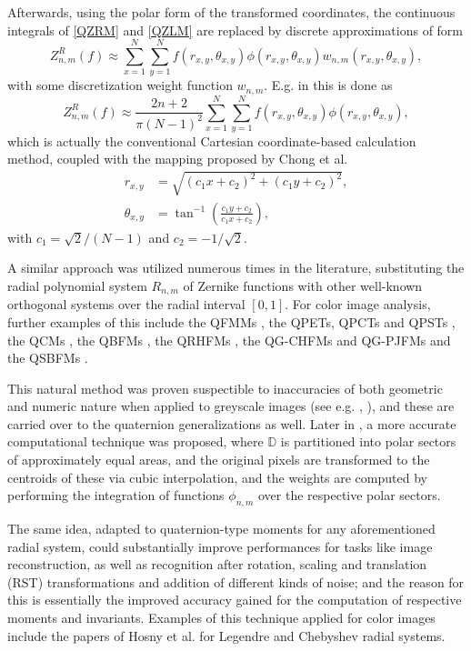 \documentclass[12pt]{article}
\newcommand{\D}{\mathbb{D}}
\begin{document}
Afterwards, using the polar form of the transformed coordinates, the continuous integrals of \eqref{QZRM} and \eqref{QZLM} are replaced by discrete approximations of form
\[
	Z_{n,m}^R(f) \approx \sum_{x=1}^N \sum_{y=1}^N f(r_{x,y},\theta_{x,y}) \phi(r_{x,y},\theta_{x,y}) w_{n,m}(r_{x,y},\theta_{x,y}),
\]
with some discretization weight function $w_{n,m}$. E.g. in \cite{ChenOriginal} this is done as
\[
	Z_{n,m}^R(f) \approx \frac{2n+2}{\pi (N-1)^2}  \sum_{x=1}^N \sum_{y=1}^N f(r_{x,y},\theta_{x,y}) \phi(r_{x,y},\theta_{x,y}),
\]
which is actually the conventional Cartesian coordinate-based calculation method, coupled with the mapping proposed by Chong et al. \cite{Chong}
\[
\begin{split}
	r_{x,y} &= \sqrt{(c_1x + c_2)^2 + (c_1y + c_2)^2}, \\
	\theta_{x,y} &= \tan^{-1}\left(\frac{c_1y + c_2}{c_1x + c_2}\right),
\end{split}
\]
with $c_1=\sqrt{2}/(N-1)$ and $c_2=-1/\sqrt{2}$. 

A similar approach was utilized numerous times in the literature, substituting the radial polynomial system $R_{n,m}$ of Zernike functions with other well-known orthogonal systems over the radial interval $[0,1]$. For color image analysis, further examples of this include the QFMMs \cite{GuoZhu}, the QPETs, QPCTs and QPSTs \cite{Li}, the QCMs \cite{Guo}, the QBFMs \cite{Shao}, the QRHFMs \cite{Wang}, the QG-CHFMs and QG-PJFMs \cite{Singh} and the QSBFMs \cite{Yang}.

This natural method was proven suspectible to inaccuracies of both geometric and numeric nature when applied to greyscale images (see e.g.  \cite{LiaoPawlak}, \cite{PawlakLiao}), and these are carried over to the quaternion generalizations as well. Later in \cite{Xin}, a more accurate computational technique was proposed, where $\D$ is partitioned into polar sectors of approximately equal areas, and the original pixels are transformed to the centroids of these via cubic interpolation, and the weights are computed by performing the integration of functions $\phi_{n,m}$ over the respective polar sectors. 

The same idea, adapted to quaternion-type moments for any aforementioned radial system, could substantially improve performances for tasks like image reconstruction, as well as recognition after rotation, scaling and translation (RST) transformations and addition of different kinds of noise; and the reason for this is essentially the improved accuracy gained for the computation of respective moments and invariants. Examples of this technique applied for color images include the papers of Hosny et al. for Legendre \cite{HosnyLegendre} and Chebyshev \cite{HosnyChebyshev} radial systems.
\end{document}
